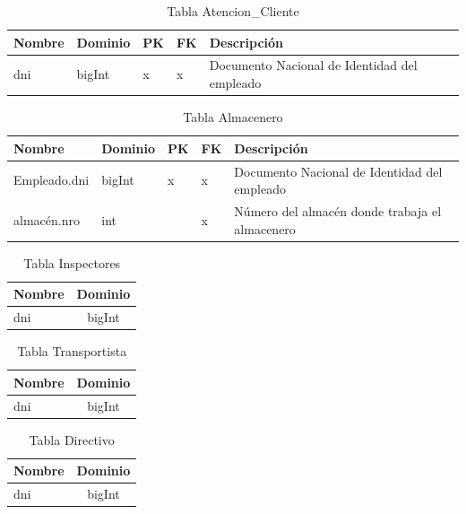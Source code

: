 \documentclass[10pt, a4paper,openany]{report}
\begin{document}
\begin{table}[h]
\centering
\begin{tabular}{|l|p{1.5cm}|p{0.5cm}|p{0.5cm}|p{3cm}|}
\hline
\textbf{Nombre} & \textbf{Dominio} & \textbf{PK} & \textbf{FK} & \textbf{Descripción} \\
\hline
dni & bigInt & x & x & Documento Nacional de Identidad del empleado \\
\hline
\end{tabular}
\caption{Tabla Atencion\_Cliente}
\end{table} 

\begin{table}[h]
\centering
\begin{tabular}{|l|p{1.5cm}|p{0.5cm}|p{0.5cm}|p{3cm}|}
\hline
\textbf{Nombre} & \textbf{Dominio} & \textbf{PK} & \textbf{FK} & \textbf{Descripción} \\
\hline
Empleado.dni & bigInt &x & x & Documento Nacional de Identidad del empleado \\
\hline
almacén.nro & int & & x & Número del almacén donde trabaja el almacenero \\
\hline
\end{tabular}
\caption{Tabla Almacenero}
\end{table}

\begin{table}[h]
\centering
\begin{tabular}{|l|c|}
\hline
\textbf{Nombre} & \textbf{Dominio} \\
\hline
dni & bigInt \\
\hline
\end{tabular}
\caption{Tabla Inspectores}
\end{table}

\begin{table}[h]
\centering
\begin{tabular}{|l|c|}
\hline
\textbf{Nombre} & \textbf{Dominio} \\
\hline
dni & bigInt \\
\hline
\end{tabular}
\caption{Tabla Transportista}
\end{table}

\begin{table}[h]
\centering
\begin{tabular}{|l|c|}
\hline
\textbf{Nombre} & \textbf{Dominio} \\
\hline
dni & bigInt\\
\hline
\end{tabular}
\caption{Tabla Directivo}
\end{table}
\end{document}
